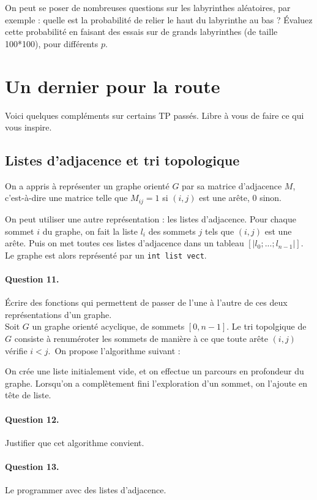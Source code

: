 \documentclass[10pt,a4paper]{article}
\begin{document}
On peut se poser de nombreuses questions sur les labyrinthes aléatoires, par 
exemple : quelle est la probabilité de relier le haut du labyrinthe au bas ? Évaluez 
cette probabilité en faisant des essais sur de grands labyrinthes (de taille 100*100), 
pour différents $p$.
\section{Un dernier pour la route}
Voici quelques compléments sur certains TP passés. Libre à vous de faire ce qui vous 
inspire.
\subsection{Listes d'adjacence et tri topologique}
On a appris à représenter un graphe orienté $G$ par sa matrice d'adjacence $M$, 
c'est-à-dire une matrice telle que $M_{ij}=1$ si $(i,j)$ est une arête, $0$ sinon.

On peut utiliser une autre représentation : les listes d'adjacence. Pour chaque sommet 
$i$ du graphe, on fait la liste $l_i$ des sommets $j$ tels que $(i,j)$ est une arête. 
Puis on met toutes ces listes d'adjacence dans un tableau $[|l_0 ; ... ; l_{n-1}|]$. 
Le graphe est alors représenté par un \texttt{int list vect}.
\paragraph{Question 11.} Écrire des fonctions qui permettent de passer de l'une à 
l'autre de ces deux représentations d'un graphe.
\\

Soit $G$ un graphe orienté acyclique, de sommets $[0,n-1]$. Le tri topolgique de 
$G$ consiste à renuméroter les sommets de manière à ce que toute arête $(i,j)$ 
vérifie $i<j$. On propose l'algorithme suivant :

On crée une liste initialement vide, et on effectue un parcours en profondeur du 
graphe. Lorsqu'on a complètement fini l'exploration d'un sommet, on l'ajoute en 
tête de liste.

\paragraph{Question 12.} Justifier que cet algorithme convient.

\paragraph{Question 13.} Le programmer avec des listes d'adjacence.
\\
\end{document}
